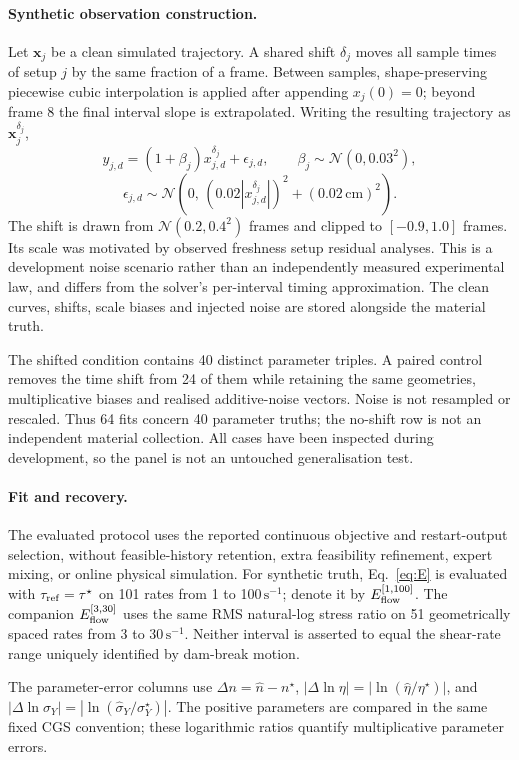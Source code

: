 \paragraph{Synthetic observation construction.}
Let $\mathbf x_j$ be a clean simulated trajectory.
A shared shift $\delta_j$ moves all sample times of setup $j$ by the
same fraction of a frame. Between samples, shape-preserving piecewise
cubic interpolation is applied after appending $x_j(0)=0$;
beyond frame 8 the final interval slope is extrapolated.
Writing the resulting trajectory as $\mathbf x_j^{\delta_j}$,
\[
 y_{j,d}=(1+\beta_j)x_{j,d}^{\delta_j}+\epsilon_{j,d},\qquad
 \beta_j\sim\mathcal N(0,0.03^2),
\]
\[
 \epsilon_{j,d}\sim\mathcal N\!\left(0,\,
 (0.02|x_{j,d}^{\delta_j}|)^2+(0.02\,\mathrm{cm})^2\right).
\]
The shift is drawn from $\mathcal N(0.2,0.4^2)$ frames and clipped
to $[-0.9,1.0]$ frames. Its scale was motivated by observed freshness
setup residual analyses. This is a development noise scenario rather
than an independently measured experimental law, and differs from
the solver's per-interval timing approximation.
The clean curves, shifts, scale biases and injected noise are stored
alongside the material truth.

The shifted condition contains 40 distinct parameter triples.
A paired control removes the time shift from 24 of them while
retaining the same geometries, multiplicative biases and realised
additive-noise vectors. Noise is not resampled or rescaled.
Thus 64 fits concern 40 parameter truths; the no-shift row is not
an independent material collection. All cases have been inspected
during development, so the panel is not an untouched generalisation test.

\paragraph{Fit and recovery.}
The evaluated protocol uses the reported continuous objective and
restart-output selection, without feasible-history retention, extra
feasibility refinement, expert mixing, or online physical simulation.
For synthetic truth, Eq.~\eqref{eq:E} is evaluated with
$\tau_{\rm ref}=\tau^\star$ on 101 rates from 1 to
100\,$\mathrm{s}^{-1}$; denote it by $E_{\rm flow}^{[1,100]}$.
The companion $E_{\rm flow}^{[3,30]}$ uses the same RMS natural-log
stress ratio on 51 geometrically spaced rates from 3 to
30\,$\mathrm{s}^{-1}$. Neither interval is asserted to equal the
shear-rate range uniquely identified by dam-break motion.

The parameter-error columns use $\Delta n=\hat n-n^\star$,
$|\Delta\ln\eta|=|\ln(\hat\eta/\eta^\star)|$, and
$|\Delta\ln\sigma_Y|=|\ln(\hat\sigma_Y/\sigma_Y^\star)|$.
The positive parameters are compared in the same fixed CGS convention;
these logarithmic ratios quantify multiplicative parameter errors.

